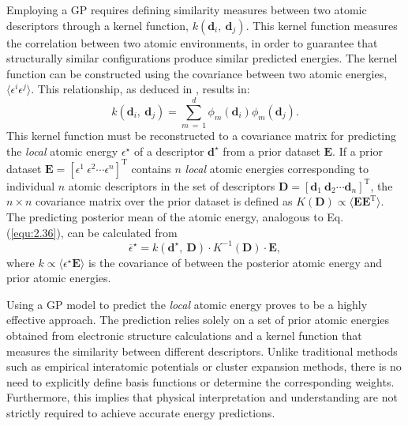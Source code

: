 Employing a GP requires defining similarity measures between two atomic descriptors through a kernel function, $k(\textbf{d}_{i},\:\textbf{d}_{j})$.
This kernel function measures the correlation between two atomic environments, in order to guarantee that structurally similar configurations produce similar predicted energies.
The kernel function can be constructed using the covariance between two atomic energies, \( \langle \epsilon^{i} \epsilon^{j} \rangle \). This relationship, as deduced in \cite{Bartk2015}, results in:
\begin{equation}
    \label{equ:2.50}
    k(\textbf{d}_{i},\:\textbf{d}_{j}) = \sum_{m\:=\:1}^{d}\phi_{m}(\textbf{d}_{i})\phi_{m}(\textbf{d}_{j}).
\end{equation}
This kernel function must be reconstructed to a covariance matrix for predicting the \textit{local} atomic energy $\epsilon^{\star}$ of a descriptor $\textbf{d}^{\star}$ from a prior dataset $\textbf{E}$. 
If a prior dataset $\textbf{E}= \left[\epsilon^{1}\:\epsilon^{2}\cdots\epsilon^{n} \right]^{\text{T}}$ contains $n$ \textit{local} atomic energies corresponding to individual $n$ atomic descriptors in the set of descriptors $\textbf{D}= \left[\textbf{d}_{1}\:\textbf{d}_{2}\cdots\textbf{d}_{n} \right]^{\text{T}}$, the $n\times n$ covariance matrix over the prior dataset is defined as $K(\textbf{D}) \propto \langle \textbf{E}\textbf{E}^{\text{T}} \rangle$. 
The predicting posterior mean of the atomic energy, analogous to Eq. (\ref{equ:2.36}), can be calculated from 
\begin{equation}
    \label{equ:2.51}
    \overline{\epsilon}^{\star} = k(\textbf{d}^{\star},\:\textbf{D})\cdot K^{-1}(\textbf{D})\cdot\textbf{E},
\end{equation}
where $k\propto\langle \epsilon^{\star}\textbf{E}\rangle$ is the covariance of between the posterior atomic energy and prior atomic energies.

Using a GP model to predict the \textit{local} atomic energy proves to be a highly effective approach.
The prediction relies solely on a set of prior atomic energies obtained from electronic structure calculations and a kernel function that measures the similarity between different descriptors.
Unlike traditional methods such as empirical interatomic potentials or cluster expansion methods, there is no need to explicitly define basis functions or determine the corresponding weights.
Furthermore, this implies that physical interpretation and understanding are not strictly required to achieve accurate energy predictions.

